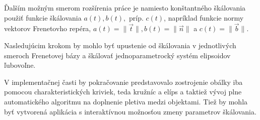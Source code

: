 Ďalším možným smerom rozšírenia práce je namiesto konštantného škálovania použiť funkcie škálovania $a(t), b(t),$ príp. $c(t)$, napríklad funkcie normy vektorov Frenetovho repéra, $a(t) = \| \vec{t} \|, b(t) = \| \vec{n} \| $ a $c(t) = \| \vec{b} \|$. 

Nasledujúcim krokom by mohlo byť upustenie od škálovania v jednotlivých smeroch Frenetovej bázy a škálovať jednoparametrocký systém elipsoidov ľubovoľne.

V implementačnej časti by pokračovanie predstavovalo zostrojenie obálky iba pomocou charakteristických kriviek, teda kružníc a elíps a taktiež vývoj plne automatického algoritmu na doplnenie pletiva medzi objektami. Tiež by mohla byť vytvorená aplikácia s interaktívnou možnosťou zmeny parametrov škálovania.